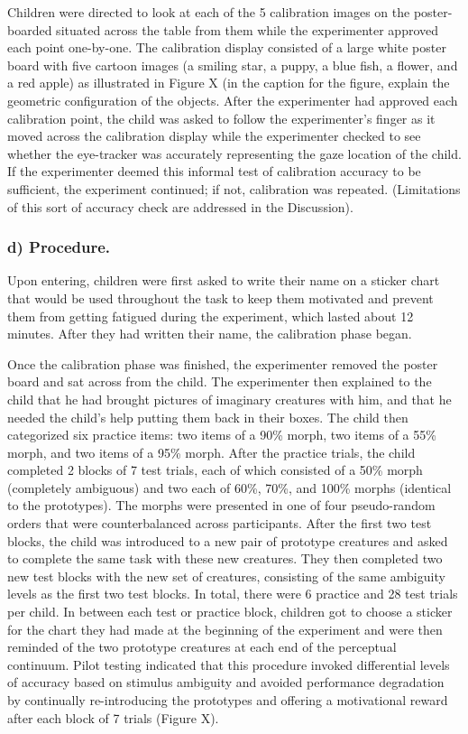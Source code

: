 \documentclass[man]{apa6}
\theoremstyle{definition}
\theoremstyle{definition}
\theoremstyle{definition}
\theoremstyle{remark}
\begin{document}
Children were directed to look at each of the 5 calibration images on
the poster-boarded situated across the table from them while the
experimenter approved each point one-by-one. The calibration display
consisted of a large white poster board with five cartoon images (a
smiling star, a puppy, a blue fish, a flower, and a red apple) as
illustrated in Figure X (in the caption for the figure, explain the
geometric configuration of the objects. After the experimenter had
approved each calibration point, the child was asked to follow the
experimenter's finger as it moved across the calibration display while
the experimenter checked to see whether the eye-tracker was accurately
representing the gaze location of the child. If the experimenter deemed
this informal test of calibration accuracy to be sufficient, the
experiment continued; if not, calibration was repeated. (Limitations of
this sort of accuracy check are addressed in the Discussion).

\subsubsection{d) Procedure.}\label{d-procedure.}

Upon entering, children were first asked to write their name on a
sticker chart that would be used throughout the task to keep them
motivated and prevent them from getting fatigued during the experiment,
which lasted about 12 minutes. After they had written their name, the
calibration phase began.

Once the calibration phase was finished, the experimenter removed the
poster board and sat across from the child. The experimenter then
explained to the child that he had brought pictures of imaginary
creatures with him, and that he needed the child's help putting them
back in their boxes. The child then categorized six practice items: two
items of a 90\% morph, two items of a 55\% morph, and two items of a
95\% morph. After the practice trials, the child completed 2 blocks of 7
test trials, each of which consisted of a 50\% morph (completely
ambiguous) and two each of 60\%, 70\%, and 100\% morphs (identical to
the prototypes). The morphs were presented in one of four pseudo-random
orders that were counterbalanced across participants. After the first
two test blocks, the child was introduced to a new pair of prototype
creatures and asked to complete the same task with these new creatures.
They then completed two new test blocks with the new set of creatures,
consisting of the same ambiguity levels as the first two test blocks. In
total, there were 6 practice and 28 test trials per child. In between
each test or practice block, children got to choose a sticker for the
chart they had made at the beginning of the experiment and were then
reminded of the two prototype creatures at each end of the perceptual
continuum. Pilot testing indicated that this procedure invoked
differential levels of accuracy based on stimulus ambiguity and avoided
performance degradation by continually re-introducing the prototypes and
offering a motivational reward after each block of 7 trials (Figure X).
\end{document}
